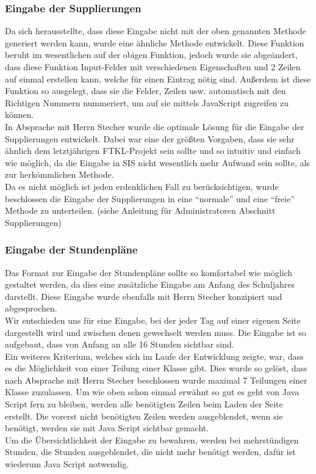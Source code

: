 \subsubsection{Eingabe der Supplierungen}
Da sich herausstellte, dass diese Eingabe nicht mit der oben genannten Methode generiert werden kann, wurde eine ähnliche Methode entwickelt. Diese Funktion beruht im wesentlichen auf der obigen Funktion, jedoch wurde sie abgeändert, dass diese Funktion Input-Felder mit verschiedenen Eigenschaften und 2 Zeilen auf einmal erstellen kann, welche für einen Eintrag nötig sind. Außerdem ist diese Funktion so ausgelegt, dass sie die Felder, Zeilen usw. automatisch mit den Richtigen Nummern nummeriert, um auf sie mittels JavaScript zugreifen zu können.\\
In Absprache mit Herrn Stecher wurde die optimale Lösung für die Eingabe der Supplierungen entwickelt. Dabei war eine der größten Vorgaben, dass sie sehr ähnlich dem letztjährigen FTKL-Projekt sein sollte und so intuitiv und einfach wie möglich, da die Eingabe in SIS nicht wesentlich mehr Aufwand sein sollte, als zur herkömmlichen Methode.\\
Da es nicht möglich ist jeden erdenklichen Fall zu berücksichtigen, wurde beschlossen die Eingabe der Supplierungen in eine \enquote{normale} und eine \enquote{freie} Methode zu unterteilen. (siehe Anleitung für Administratoren Abschnitt Supplierungen)
\subsubsection{Eingabe der Stundenpläne}
Das Format zur Eingabe der Stundenpläne sollte so komfortabel wie möglich gestaltet werden, da dies eine zusätzliche Eingabe am Anfang des Schuljahres darstellt. Diese Eingabe wurde ebenfalls mit Herrn Stecher konzipiert und abgesprochen.\\
Wir entschieden uns für eine Eingabe, bei der jeder Tag auf einer eigenen Seite dargestellt wird und zwischen denen gewechselt werden muss. Die Eingabe ist so aufgebaut, dass von Anfang an alle 16 Stunden sichtbar sind.\\ 
Ein weiteres Kriterium, welches sich im Laufe der Entwicklung zeigte, war, dass es die Möglichkeit von einer Teilung einer Klasse gibt. Dies wurde so gelöst, dass nach Absprache mit Herrn Stecher beschlossen wurde maximal 7 Teilungen einer Klasse zuzulassen. Um wie oben schon einmal erwähnt so gut es geht von Java Script fern zu bleiben, werden alle benötigten Zeilen beim Laden der Seite erstellt. Die vorerst nicht benötigten Zeilen werden ausgeblendet, wenn sie benötigt, werden sie mit Java Script sichtbar gemacht.\\
Um die Übersichtlichkeit der Eingabe zu bewahren, werden bei mehrstündigen Stunden, die Stunden ausgeblendet, die nicht mehr benötigt werden, dafür ist wiederum Java Script notwendig.
